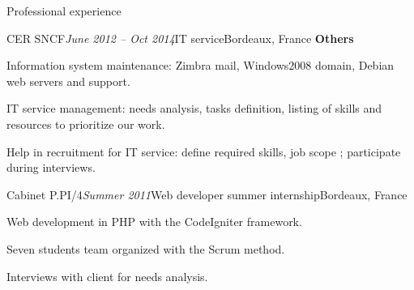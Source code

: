 \begin{rSection}{Professional experience}
\begin{rSubsection}{CER SNCF}{\em June 2012 -- Oct 2014}{IT service}{Bordeaux, France}
    \textbf{Others}
      \item Information system maintenance: Zimbra mail, Windows2008 domain, Debian web servers and support.
      \item IT service management: needs analysis, tasks definition, listing of skills and resources to prioritize our work.
      \item Help in recruitment for IT service: define required skills, job scope ; participate during interviews.

  \end{rSubsection}


  \begin{rSubsection}{Cabinet P.PI/4}{\em Summer 2011}{Web developer summer internship}{Bordeaux, France}
    \item Web development in PHP with the CodeIgniter framework.
    \item Seven students team organized with the Scrum method.
    \item Interviews with client for needs analysis.
  \end{rSubsection}

\end{rSection}
